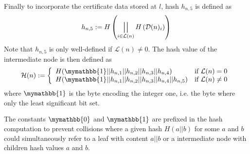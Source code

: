 \documentclass[10pt,conference,compsocconf]{IEEEtran}
\newcommand{\mathbbzero}{\mymathbb{0}}
\newcommand{\mathbbone}{\mymathbb{1}}
\DeclareMathOperator*{\concat}{\scalerel*{||}{\sum}}
\begin{document}
Finally to incorporate the certificate data stored at $l$, hash $h_{n,5}$ is defined as
\begin{align}
	\label{eq:hash-certs-intermediate-node}
	h_{n,5} := H\left(\concat_{i \in \mathcal{L}(n)} H\left(\mathcal{D}(n)_i\right)\right)
\end{align}
Note that $h_{n,5}$ is only well-defined if $\mathcal{L}(n) \neq 0$.
The hash value of the intermediate node is then defined as
\begin{align}
	\label{eq:hash-intermediate-node}
	\mathcal{H}(n) := \left\{
	\begin{array}{lr}
		H(\mathbbone || h_{n,1} || h_{n,2} || h_{n,3} || h_{n,4}) & \text{if $\mathcal{L}(n) = 0$}\\
		H(\mathbbone || h_{n,1} || h_{n,2} || h_{n,3} || h_{n,4} || h_{n,5}) & \text{if $\mathcal{L}(n) \neq 0$}
	\end{array}\right.
\end{align}
where $\mathbbone$ is the byte encoding the integer one, i.e. the byte where only the least significant bit set.

The constants $\mathbbzero$ and $\mathbbone$ are prefixed in the hash computation to prevent collisions where a given hash $H(a || b)$ for some $a$ and $b$ could simultaneously refer to a leaf with content $a || b$ or a intermediate node with children hash values $a$ and $b$.

%
%
\end{document}
